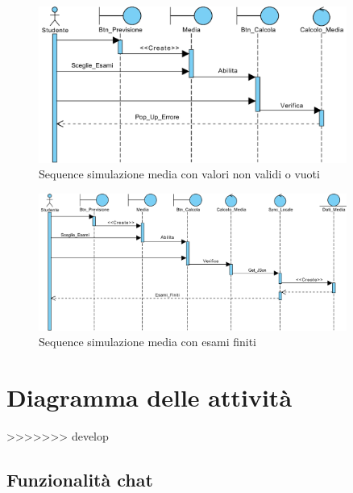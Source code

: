 \begin{figure}[H]
	\centering
	\includegraphics[width=0.9\textwidth]{imgs/gruppo3/sequence-media-valori-non-validi.pdf}
	\caption{Sequence simulazione media con valori non validi o vuoti}
	\label{fig:seq2-media}
\end{figure}

\begin{figure}[H]
	\centering
	\includegraphics[width=0.9\textwidth]{imgs/gruppo3/sequence-media-esami-finiti.pdf}
	\caption{Sequence simulazione media con esami finiti}
	\label{fig:seq3-media}
\end{figure}

\clearpage

\section{Diagramma delle attività}
>>>>>>> develop

\subsection{Funzionalità chat}


